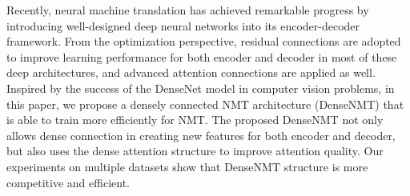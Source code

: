 Recently, neural machine translation has achieved remarkable progress by introducing well-designed deep neural networks into its encoder-decoder framework. From the optimization perspective, residual connections are adopted to improve learning performance for both encoder and decoder in most of these deep architectures, and advanced attention connections are applied as well. Inspired by the success of the DenseNet model in computer vision problems, in this paper, we propose a densely connected NMT architecture (DenseNMT) that is able to train more efficiently for NMT. The proposed DenseNMT not only allows dense connection in creating new features for both encoder and decoder, but also uses the dense attention structure to improve attention quality. Our experiments on multiple datasets show that DenseNMT structure is more competitive and efficient.
